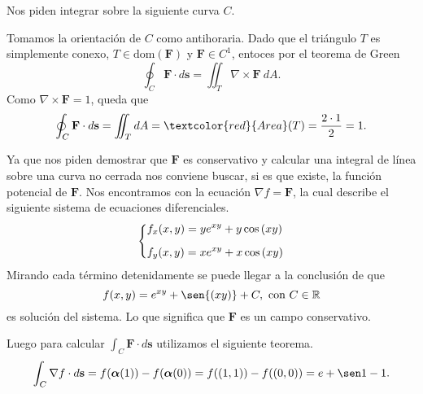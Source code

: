 
\begin{solution}
    Nos piden integrar sobre la siguiente curva $C$.

    \begin{center}
    \end{center}

    Tomamos la orientaci\'on de $C$ como antihoraria.
    Dado que el tri\'angulo $T$  es simplemente conexo,   $T  \in \text{dom}(\mathbf{F})$ y $\mathbf{F}\in C^1$, entoces por el teorema de Green
    \[
        \oint_C \mathbf{F}\cdot d\mathbf{s} = \iint_T \nabla\times\mathbf{F}\:dA.
    \]
    Como $\nabla\times\mathbf{F} = 1$, queda que \[\oint_C \mathbf{F}\cdot d\mathbf{s} = \iint_T dA = \textcolor{red}{Area}(T) = \frac{2\cdot1}{2} = 1.\]
\end{solution}


\begin{solution}
    Ya que nos piden demostrar que $\mathbf{F}$ es conservativo y calcular una integral de l\'inea sobre una curva no cerrada nos conviene buscar, si es que existe, la funci\'on potencial de $\mathbf{F}$. Nos encontramos con la ecuaci\'on $\nabla f = \mathbf{F}$, la cual describe el siguiente sistema de ecuaciones diferenciales.
    \[
        \begin{dcases}
            f_x(x,y) = ye^{xy} + y \cos{(xy)} \\[.2cm]
            f_y(x,y) = xe^{xy} + x \cos{(xy)}
        \end{dcases}
    \]
    Mirando cada t\'ermino detenidamente se puede llegar a la conclusi\'on de que $$f(x,y) = e^{xy} + \sen{(xy)} + C, \mbox{ con } C\in\Re$$ es soluci\'on del sistema. Lo que significa que $\mathbf{F}$ es un campo conservativo.

    Luego para calcular $\int_C \mathbf{F}\cdot d\mathbf{s}$ utilizamos el siguiente teorema.
    \[
        \int_C \nabla f\cdot d\mathbf{s} = f(\boldsymbol{\alpha}(1)) - f(\boldsymbol{\alpha}(0)) = f((1,1)) - f((0,0)) = e + \sen1 - 1.
    \]
\end{solution}


